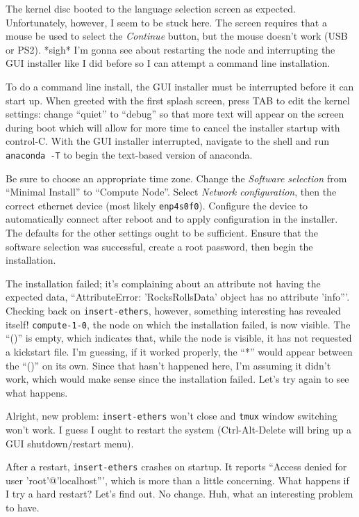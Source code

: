 \documentclass[12pt]{article}
\begin{document}
\qq The kernel disc booted to the language selection screen as
expected. Unfortunately, however, I seem to be stuck here. The screen requires
that a mouse be used to select the \textit{Continue} button, but the mouse
doesn't work (USB or PS2). *sigh* I'm gonna see about restarting the node and
interrupting the GUI installer like I did before so I can attempt a command line
installation.

\qq To do a command line install, the GUI installer must be interrupted before
it can start up. When greeted with the first splash screen, press TAB to edit
the kernel settings: change ``quiet'' to ``debug'' so that more text will appear
on the screen during boot which will allow for more time to cancel the installer
startup with control-C. With the GUI installer interrupted, navigate to the
shell and run {\tt anaconda -T} to begin the text-based version of
anaconda.

\qq Be sure to choose an appropriate time zone. Change the \textit{Software
  selection} from ``Minimal Install'' to ``Compute Node''. Select
\textit{Network configuration}, then the correct ethernet device (most
likely {\tt enp4s0f0}). Configure the device to automatically connect after
reboot and to apply configuration in the installer. The defaults for the other
settings ought to be sufficient. Ensure that the software selection was
successful, create a root password, then begin the installation.

\qq The installation failed; it's complaining about an attribute not having the
expected data, ``AttributeError: 'RocksRollsData' object has no attribute
'info'''. Checking back on {\tt insert-ethers}, however, something interesting
has revealed itself! {\tt compute-1-0}, the node on which the installation
failed, is now visible. The ``()'' is empty, which indicates that, while the
node is visible, it has not requested a kickstart file. I'm guessing, if it
worked properly, the ``*'' would appear between the ``()'' on its own. Since
that hasn't happened here, I'm assuming it didn't work, which would make sense
since the installation failed. Let's try again to see what happens.

\qq Alright, new problem: {\tt insert-ethers} won't close and {\tt tmux} window
switching won't work. I guess I ought to restart the system (Ctrl-Alt-Delete
will bring up a GUI shutdown/restart menu).

\qq After a restart, {\tt insert-ethers} crashes on startup. It reports ``Access
denied for user 'root'@'localhost''', which is more than a little
concerning. What happens if I try a hard restart? Let's find out. No
change. Huh, what an interesting problem to have.
\end{document}
